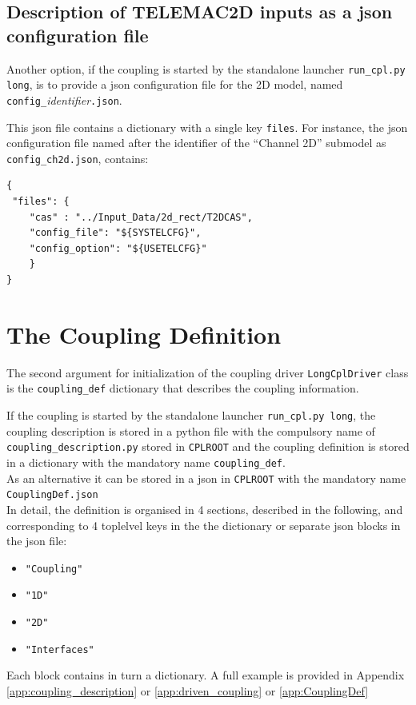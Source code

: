 \subsection{Description of TELEMAC2D inputs as a json configuration file}
Another option, if the coupling is started by the standalone launcher
\texttt{run\_cpl.py long}, is to provide a json configuration file
for the 2D model, named \\
\texttt{config\_}{\em identifier}\texttt{.json}.

This json file contains a dictionary with a single key \texttt{files}. For instance, the json configuration file named after the identifier of the ``Channel 2D'' submodel as \texttt{config\_ch2d.json}, contains:
\begin{verbatim}
{
 "files": {
    "cas" : "../Input_Data/2d_rect/T2DCAS",
    "config_file": "${SYSTELCFG}",
    "config_option": "${USETELCFG}"
    }
}
\end{verbatim}

\section{The Coupling Definition}\label{json:CouplingDef}
The second argument for initialization of the coupling driver
\texttt{LongCplDriver} class is the \texttt{coupling\_def} dictionary that describes the coupling information.

If the coupling is started by the standalone launcher
\texttt{run\_cpl.py long}, the coupling description is stored in
a python file with the compulsory name of \texttt{coupling\_description.py} stored in
\texttt{CPLROOT} and the coupling definition is stored in a
dictionary with the mandatory name \texttt{coupling\_def}.\\
As an alternative it can be stored in a json in
\texttt{CPLROOT} with the mandatory name\\
\texttt{CouplingDef.json}\\

In detail, the definition is organised in 4 sections, described in the following, and corresponding to
4 toplelvel keys in the the dictionary or separate json
blocks in the json file:
\begin{itemize}
\item\texttt{"Coupling"}
\item\texttt{"1D"}
\item\texttt{"2D"}
\item\texttt{"Interfaces"}
\end{itemize}
Each block contains in turn a dictionary.  A full example is provided in Appendix \ref{app:coupling_description}
or \ref{app:driven_coupling} or \ref{app:CouplingDef}

